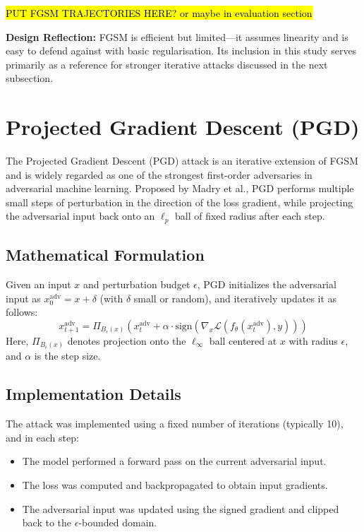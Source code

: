 \hl{PUT FGSM TRAJECTORIES HERE? or maybe in evaluation section}


\noindent \textbf{Design Reflection:}  
FGSM is efficient but limited—it assumes linearity and is easy to defend against with basic regularisation. Its inclusion in this study serves primarily as a reference for stronger iterative attacks discussed in the next subsection.

\section{Projected Gradient Descent (PGD)}

The Projected Gradient Descent (PGD) attack is an iterative extension of FGSM and is widely regarded as one of the strongest first-order adversaries in adversarial machine learning. Proposed by Madry et al., PGD performs multiple small steps of perturbation in the direction of the loss gradient, while projecting the adversarial input back onto an $\ell_p$ ball of fixed radius after each step.

\subsection{Mathematical Formulation}
Given an input $x$ and perturbation budget $\epsilon$, PGD initializes the adversarial input as $x_0^{\text{adv}} = x + \delta$ (with $\delta$ small or random), and iteratively updates it as follows:
\[
x_{t+1}^{\text{adv}} = \Pi_{B_\epsilon(x)} \left( x_t^{\text{adv}} + \alpha \cdot \text{sign}\left( \nabla_x \mathcal{L}(f_\theta(x_t^{\text{adv}}), y) \right) \right)
\]
Here, $\Pi_{B_\epsilon(x)}$ denotes projection onto the $\ell_\infty$ ball centered at $x$ with radius $\epsilon$, and $\alpha$ is the step size.

\subsection{Implementation Details}
The attack was implemented using a fixed number of iterations (typically 10), and in each step:
\begin{itemize}
    \item The model performed a forward pass on the current adversarial input.
    \item The loss was computed and backpropagated to obtain input gradients.
    \item The adversarial input was updated using the signed gradient and clipped back to the $\epsilon$-bounded domain.
\end{itemize}


